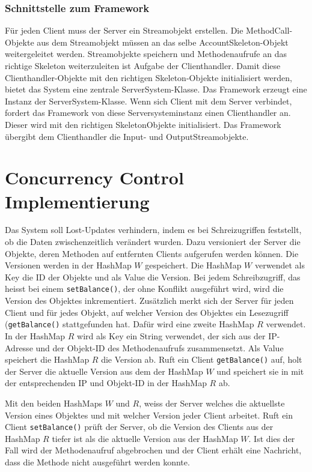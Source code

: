 \subsubsection{Schnittstelle zum Framework}
\label{sec:schn-zum-fram}

Für jeden Client muss der Server ein Streamobjekt erstellen. Die
Method\-Call-Objekte aus dem Streamobjekt müssen an das selbe
AccountSkeleton-Objekt weitergeleitet werden. Streamobjekte speichern
und Methodenauf\-rufe an das richtige Skeleton weiterzuleiten ist
Aufgabe der Clienthandler. Damit diese Clienthandler-Objekte mit den
richtigen Skeleton-Objekte initialisiert werden, bietet das System
eine zentrale ServerSystem-Klasse. Das Framework erzeugt eine Instanz
der ServerSystem-Klasse. Wenn sich Client mit dem Server verbindet,
fordert das Framework von diese Serversystem\-instanz einen
Clienthandler an. Dieser wird mit den richtigen SkeletonObjekte
initialisiert. Das Framework übergibt dem Clienthandler die Input- und OutputStreamobjekte.

\section{Concurrency Control Implementierung }
\label{sec:conc-contr-impl}

Das System soll Lost-Updates verhindern, indem es bei Schreizugriffen
feststellt, ob die Daten zwischenzeitlich verändert wurden. Dazu
versioniert der Server die Objekte, deren Methoden auf entfernten
Clients aufgerufen werden können. Die Versionen werden in der HashMap
$W$ gespeichert. Die HashMap $W$ verwendet als Key die ID der Objekte
und als Value die Version. Bei jedem Schreibzugriff, das heisst bei
einem \verb|setBalance()|, der ohne Konflikt ausgeführt wird, wird die
Version des Objektes inkrementiert. Zusätzlich merkt sich der Server
für jeden Client und für jedes Objekt, auf welcher Version des
Objektes ein Lesezugriff (\verb|getBalance()| stattgefunden hat. Dafür
wird eine zweite HashMap $R$ verwendet. In der HashMap $R$ wird als Key
ein String verwendet, der sich aus der IP-Adresse und der
Objekt-ID des Methodenaufrufs zusammensetzt. Als Value speichert die HashMap $R$ die Version ab.
Ruft ein Client
\verb|getBalance()| auf, holt der Server die aktuelle Version aus dem
der HashMap $W$ und speichert sie in mit der entsprechenden IP und
Objekt-ID in der HashMap $R$ ab.

Mit den beiden HashMaps $W$ und $R$, weiss der Server welches die
aktuellste Version eines Objektes und mit welcher Version jeder Client
arbeitet. Ruft ein Client \verb|setBalance()| prüft der Server, ob die
Version des Clients aus der HashMap $R$ tiefer ist als die aktuelle
Version aus der HashMap $W$. Ist dies der Fall wird der Methodenaufruf
abgebrochen und der Client erhält eine Nachricht, dass die Methode
nicht ausgeführt werden konnte.